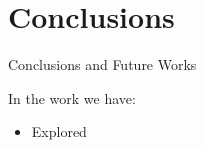 \section*{Conclusions}

\begin{frame}{Conclusions and Future Works}

    In the work we have:
    \begin{itemize}
        \item Explored 
    \end{itemize}
\end{frame}